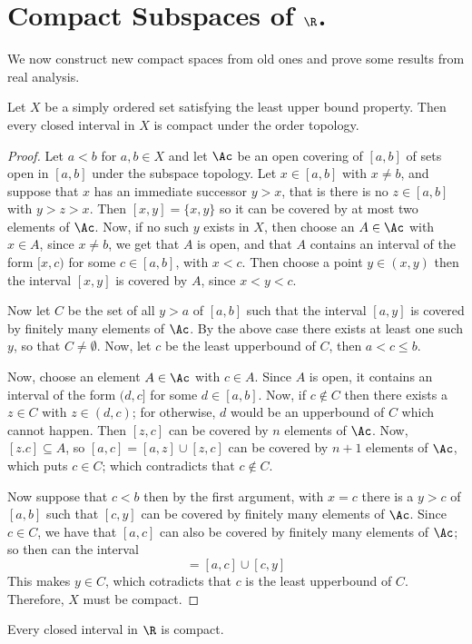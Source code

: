 
\section{Compact Subspaces of $\R$.}

We now construct new compact spaces from old ones and prove some results from
real analysis.

\begin{theorem}\label{3.6.1}
    Let $X$ be a simply ordered set satisfying the least upper bound property.
    Then every closed interval in $X$ is compact under the order topology.
\end{theorem}
\begin{proof}
    Let $a<b$ for  $a,b \in X$ and let  $\Ac$ be an open covering of  $[a,b]$ of
    sets open in $[a,b]$ under the subspace topology. Let $x \in [a,b]$ with $x
    \neq b$, and suppose that $x$ has an immediate successor  $y>x$, that is
    there is no $z \in [a,b]$ with $y>z>x$. Then $[x,y]=\{x,y\}$ so it can be
    covered by at most two elements of  $\Ac$. Now, if no such  $y$ exists in
    $X$, then choose an  $A \in \Ac$ with  $x \in A$, since  $x \neq b$, we get
    that  $A$ is open, and that  $A$ contains an interval of the form  $[x,c)$
    for some $c \in [a,b]$, with $x < c$. Then choose a point  $y \in (x,y)$
    then the interval $[x,y]$ is covered by $A$, since $x<y<c$.

    Now let $C$ be the set of all  $y>a$ of  $[a,b]$ such that the interval
    $[a,y]$ is covered by finitely many elements of $\Ac$. By the above case
    there exists at least one such  $y$, so that  $C \neq \emptyset$. Now, let
    $c$ be the least upperbound of  $C$, then  $a<c \leq b$.

    Now, choose an element $A \in \Ac$ with $c \in A$. Since $A$ is open, it
    contains an interval of the form  $(d,c]$ for some $d \in [a,b]$. Now, if $c
    \notin C$ then there exists a  $z \in C$ with  $z \in (d,c)$; for otherwise,
    $d$ would be an upperbound of $C$ which cannot happen. Then $[z,c]$ can be
    covered by $n$ elements of $\Ac$. Now,  $[z.c] \subseteq A$, so
    $[a,c]=[a,z] \cup [z,c]$ can be covered by $n+1$ elements of  $\Ac$, which
    puts  $c \in C$; which contradicts that  $c \notin C$.

    Now suppose that  $c<b$ then by the first argument, with  $x=c$ there is a
    $y>c$ of  $[a,b]$ such that $[c,y]$ can be covered by finitely many elements
    of $\Ac$. Since  $c \in C$, we have that $[a,c]$ can also be covered by
    finitely many elements of $\Ac$; so then can the interval
    \begin{equation*}
        [a,y] = [a,c] \cup [c,y]
    \end{equation*}
    This makes $y \in C$, which cotradicts that  $c$ is the least upperbound of
     $C$. Therefore, $X$ must be compact.
\end{proof}
\begin{corollary}
    Every closed interval in $\R$ is compact.
\end{corollary}


